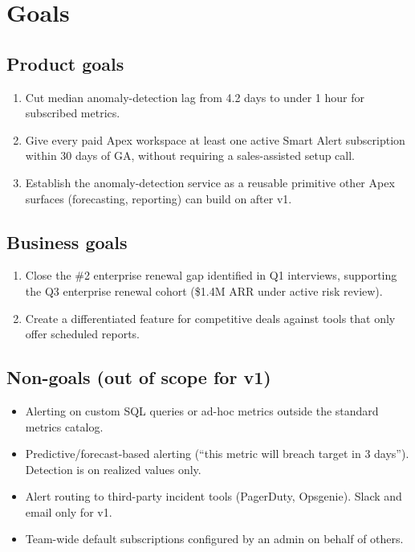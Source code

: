 \section{Goals}

\subsection*{Product goals}
\begin{enumerate}[label=\textbf{G\arabic*.}]
  \item Cut median anomaly-detection lag from 4.2 days to under 1 hour for subscribed
    metrics.
  \item Give every paid Apex workspace at least one active Smart Alert subscription
    within 30 days of GA, without requiring a sales-assisted setup call.
  \item Establish the anomaly-detection service as a reusable primitive other Apex
    surfaces (forecasting, reporting) can build on after v1.
\end{enumerate}

\subsection*{Business goals}
\begin{enumerate}[label=\textbf{B\arabic*.}]
  \item Close the \#2 enterprise renewal gap identified in Q1 interviews, supporting the
    Q3 enterprise renewal cohort (\$1.4M ARR under active risk review).
  \item Create a differentiated feature for competitive deals against tools that only
    offer scheduled reports.
\end{enumerate}

\subsection*{Non-goals (out of scope for v1)}
\begin{itemize}
  \item Alerting on custom SQL queries or ad-hoc metrics outside the standard metrics
    catalog.
  \item Predictive/forecast-based alerting (``this metric will breach target in 3
    days''). Detection is on realized values only.
  \item Alert routing to third-party incident tools (PagerDuty, Opsgenie). Slack and
    email only for v1.
  \item Team-wide default subscriptions configured by an admin on behalf of others.
\end{itemize}
